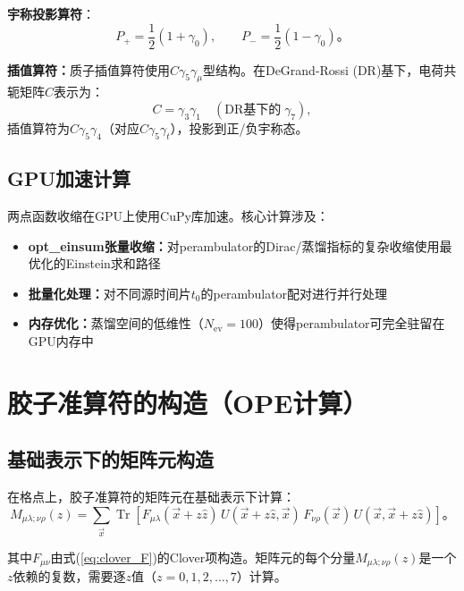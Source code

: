 \documentclass[12pt,a4paper]{ctexart}
\theoremstyle{definition}
\begin{document}
\textbf{宇称投影算符}\cite{NoteGluonPDFs,代码解析}：
\begin{equation}
P_+ = \frac{1}{2}(1+\gamma_0), \qquad P_- = \frac{1}{2}(1-\gamma_0)。
\end{equation}

\textbf{插值算符：}质子插值算符使用$C\gamma_5\gamma_\mu$型结构。在DeGrand-Rossi (DR)基下\cite{代码解析}，电荷共轭矩阵$C$表示为：
\begin{equation}
C = \gamma_3\gamma_1 \quad (\text{DR基下的}\;\gamma_7),
\end{equation}
插值算符为$C\gamma_5\gamma_4$（对应$C\gamma_5\gamma_t$），投影到正/负宇称态。

\subsection{GPU加速计算}

两点函数收缩在GPU上使用CuPy库加速\cite{代码解析}。核心计算涉及：
\begin{itemize}
    \item \textbf{opt\_einsum张量收缩：}对perambulator的Dirac/蒸馏指标的复杂收缩使用最优化的Einstein求和路径
    \item \textbf{批量化处理：}对不同源时间片$t_0$的perambulator配对进行并行处理
    \item \textbf{内存优化：}蒸馏空间的低维性（$N_{\text{ev}}=100$）使得perambulator可完全驻留在GPU内存中
\end{itemize}

\section{胶子准算符的构造（OPE计算）}
\label{sec:gluon_currents}

\subsection{基础表示下的矩阵元构造}

在格点上，胶子准算符的矩阵元在基础表示下计算\cite{NoteGluonPDFs,Chen2025gluon}：
\begin{equation}
\boxed{M_{\mu\lambda;\nu\rho}(z) = \sum_{\vec{x}} \operatorname{Tr}\left[ F_{\mu\lambda}(\vec{x}+z\hat{z}) \, U(\vec{x}+z\hat{z},\vec{x}) \, F_{\nu\rho}(\vec{x}) \, U(\vec{x},\vec{x}+z\hat{z}) \right]}。
\label{eq:lattice_ME_fund}
\end{equation}

其中$F_{\mu\nu}$由式(\ref{eq:clover_F})的Clover项构造。矩阵元的每个分量$M_{\mu\lambda;\nu\rho}(z)$是一个$z$依赖的复数，需要逐$z$值（$z=0,1,2,\ldots,7$）计算。
\end{document}
